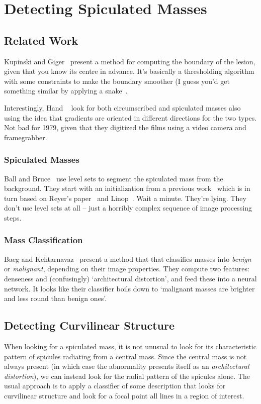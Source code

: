 \chapter{Detecting Spiculated Masses}

\section{Related Work}
Kupinski and Giger~\cite{Kupinski_Giger_TMI98} present a method for computing the boundary of the lesion, given that you know its centre in advance. It's basically a thresholding algorithm with some constraints to make the boundary smoother (I guess you'd get something similar by applying a snake~\cite{Kass_etal_IJCV88}.

Interestingly, Hand \etal~\cite{Hand_etal_CBR79} look for both circumscribed and spiculated masses also using the idea that gradients are oriented in different directions for the two types. Not bad for 1979, given that they digitized the films using a video camera and framegrabber.


\subsection{Spiculated Masses}
Ball and Bruce~\cite{Ball_Bruce_EMBC07} use level sets to segment the spiculated mass from the background. They start with an initialization from a previous work~\cite{Ball_PhD07} which is in turn based on Reyer's paper~\cite{Zwiggelaar_etal_TMI04} and Linop~\cite{Dixon_Taylor_IPC79}. Wait a minute. They're lying. They don't use level sets at all -- just a horribly complex sequence of image processing steps.


\subsection{Mass Classification}
Baeg and Kehtarnavaz~\cite{Baeg_Kehtarnavaz_ELCVIA02} present a method that that classifies masses into \emph{benign} or \emph{malignant}, depending on their image properties. They compute two features: denseness and (confusingly) `architectural distortion', and feed these into a neural network. It looks like their classifier boils down to `malignant masses are brighter and less round than benign ones'.


\section{Detecting Curvilinear Structure}
When looking for a spiculated mass, it is not unusual to look for its characteristic pattern of spicules radiating from a central mass. Since the central mass is not always present (in which case the abnormality presents itself as an \emph{architectural distortion}), we can instead look for the radial pattern of the spicules alone. The usual approach is to apply a classifier of some description that looks for curvilinear structure and look for a focal point all lines in a region of interest.

